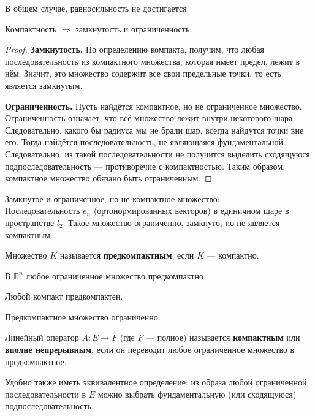 \documentclass[12pt]{article}
\begin{document}
	В общем случае, равносильность не достигается.
	
	\begin{theorem}
		Компактность $\Rightarrow$ замкнутость и ограниченность.
	\end{theorem}
	\begin{proof}
		\textbf{Замкнутость.} По определению компакта, получим, что любая последовательность из 
		компактного множества, которая имеет предел, лежит в нём. Значит, это множество содержит все свои предельные точки, то есть 
		является замкнутым.
		
		\textbf{Ограниченность.} Пусть найдётся компактное, но не ограниченное множество. Ограниченность означает, что всё множество
		лежит внутри некоторого шара. Следовательно, какого бы радиуса мы не брали шар, всегда найдутся точки вне его. Тогда
		найдётся последовательность, не являющаяся фундаментальной. Следовательно, из такой последовательности не получится выделить
		сходящуюся подпоследовательность --- противоречие с компактностью. Таким образом, компактное множество обязано быть ограниченным.
	\end{proof}
	
	\example Замкнутое и ограниченное, но не компактное множество: \\
	Последовательность $e_n$ (ортонормированных векторов) в единичном шаре в пространстве $l_2$. Такое множество ограниченно, 
	замкнуто, но не является компактным.
	
	\begin{defi}
		Множество $K$ называется \textbf{предкомпактным}, если $\overline{K}$ --- компактно.
	\end{defi}
	
	\example В $\mathbb{R}^n$ любое ограниченное множество предкомпактно.
	
	\example Любой компакт предкомпактен.
	
	\begin{note}
		Предкомпактное множество ограниченно.
	\end{note}
	
	\begin{defi}
		Линейный оператор $A:E \rightarrow F$ (где $F$ --- полное) называется \textbf{компактным} или 
		\textbf{вполне непрерывным}, если он переводит любое ограниченное множество в предкомпактное.
	\end{defi}
	
	Удобно также иметь эквивалентное определение: из образа любой ограниченной последовательности в $E$ можно выбрать 
	фундаментальную (или сходящуюся) подпоследовательность.
	
\end{document}
